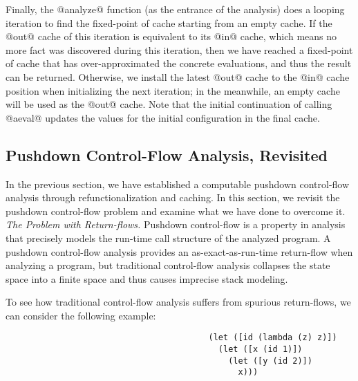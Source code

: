 \documentclass[acmsmall, review]{acmart}\settopmatter{}
\begin{document}
Finally, the @analyze@ function (as the entrance of the analysis) does a looping iteration
to find the fixed-point of cache starting from an empty cache.
If the @out@ cache of this iteration is equivalent to its @in@ cache, which means no more 
fact was discovered during this iteration, then we have reached a fixed-point of cache that 
has over-approximated the concrete evaluations, and thus the result can be returned.
Otherwise, we install the latest @out@ cache to the @in@ cache position when initializing 
the next iteration; in the meanwhile, an empty cache will be used as the @out@ cache. 
Note that the initial continuation of calling @aeval@ updates the values for the initial 
configuration in the final cache.


\subsection{Pushdown Control-Flow Analysis, Revisited} \label{pdcfarevisit}

In the previous section, we have established a computable pushdown control-flow
analysis through refunctionalization and caching. In this section, we revisit 
the pushdown control-flow problem and examine what we have done to overcome it. \\

\textit{The Problem with Return-flows.}
Pushdown control-flow is a property in analysis that precisely models the run-time
call structure of the analyzed program. A pushdown control-flow analysis provides an 
as-exact-as-run-time return-flow when analyzing a program, but traditional 
control-flow analysis collapses the state space into a finite space and thus 
causes imprecise stack modeling.

To see how traditional control-flow analysis suffers from spurious return-flows,
we can consider the following example:

\begin{lstlisting}
                                         (let ([id (lambda (z) z)])
                                           (let ([x (id 1)])
                                             (let ([y (id 2)])
                                               x)))
\end{lstlisting}
\end{document}
